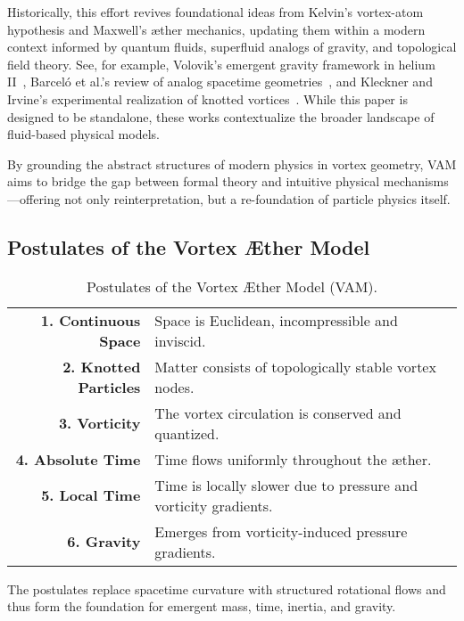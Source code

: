Historically, this effort revives foundational ideas from Kelvin’s vortex-atom hypothesis and Maxwell’s æther mechanics, updating them within a modern context informed by quantum fluids, superfluid analogs of gravity, and topological field theory. See, for example, Volovik’s emergent gravity framework in helium II~\cite{Volovik2003UniverseInHelium}, Barceló et al.'s review of analog spacetime geometries~\cite{Barcelo2005AnalogueGravityReview}, and Kleckner and Irvine's experimental realization of knotted vortices~\cite{Kleckner2013KnottedVortices}. While this paper is designed to be standalone, these works contextualize the broader landscape of fluid-based physical models.

By grounding the abstract structures of modern physics in vortex geometry, VAM aims to bridge the gap between formal theory and intuitive physical mechanisms—offering not only reinterpretation, but a re-foundation of particle physics itself.

\subsection*{Postulates of the Vortex Æther Model}
\begin{table}[h!]
    \centering
    \begin{tabular}{rl}
        \midrule
        \hline
        \textbf{1. Continuous Space} & Space is Euclidean, incompressible and inviscid. \\
        \textbf{2. Knotted Particles} & Matter consists of topologically stable vortex nodes. \\
        \textbf{3. Vorticity} & The vortex circulation is conserved and quantized. \\
        \textbf{4. Absolute Time} & Time flows uniformly throughout the æther. \\
        \textbf{5. Local Time} & Time is locally slower due to pressure and vorticity gradients. \\
        \textbf{6. Gravity} & Emerges from vorticity-induced pressure gradients. \\
        \hline
        \bottomrule
    \end{tabular}
    \caption{Postulates of the Vortex Æther Model (VAM).}
    \label{tab:postulates}
\end{table}

The postulates replace spacetime curvature with structured rotational flows and thus form the foundation for emergent mass, time, inertia, and gravity.